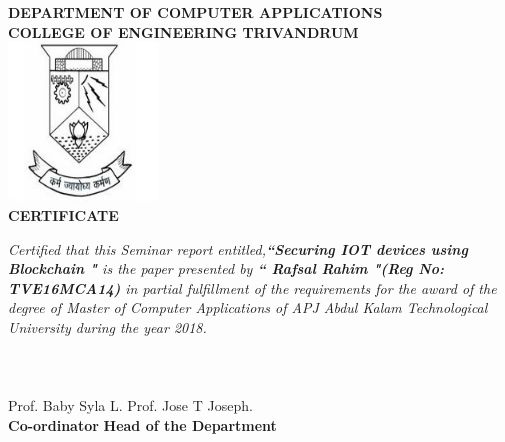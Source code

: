 \begin{titlepage}
\begin{center}
\textbf{DEPARTMENT OF COMPUTER APPLICATIONS}\\[0.5cm]
\textbf{ COLLEGE OF ENGINEERING TRIVANDRUM}\\
[0.5cm]
\vspace{1.2cm}
\includegraphics[width=0.30\textwidth]{./logo}\\
\vspace{0.8cm}
\textbf{CERTIFICATE}\\
\end{center}
\emph{Certified that this Seminar report entitled,\textbf{``Securing IOT devices using Blockchain "} is the paper presented by \textbf{`` Rafsal Rahim "(Reg No: TVE16MCA14)} in partial fulfillment of the requirements for the award of the degree of Master of Computer Applications of APJ Abdul Kalam Technological University during the year 2018.}\\\\\\\\
\vspace{0.5cm}
Prof. Baby Syla L.
\hspace{9.5cm}
Prof. Jose T Joseph.\\ 
\hspace{3.9cm} \textbf{Co-ordinator}
\hspace{9.2cm}
\textbf{Head of the Department}

\end{titlepage}
